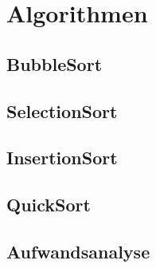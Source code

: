 \documentclass[./entry.tex]{subfiles}
\begin{document}
    \section{Algorithmen}
    \subsection{BubbleSort}
    
    \subsection{SelectionSort}
    
    \subsection{InsertionSort}
    
    \subsection{QuickSort}
    
    \subsection{Aufwandsanalyse}
    
\end{document}
